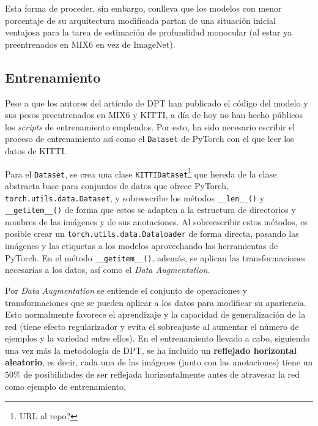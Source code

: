 Esta forma de proceder, sin embargo, conlleva que los modelos con menor porcentaje de su arquitectura modificada partan de una situación inicial ventajosa para la tarea de estimación de profundidad monocular (al estar ya preentrenados en MIX6 en vez de ImageNet).

\subsection{Entrenamiento}
Pese a que los autores del artículo de DPT \cite{visiontransformersDPT} han publicado el código del modelo y sus pesos preentrenados en MIX6 y KITTI, a día de hoy no han hecho públicos los \textit{scripts} de entrenamiento empleados. Por esto, ha sido necesario escribir el proceso de entrenamiento así como el \texttt{Dataset} de PyTorch con el que leer los datos de KITTI.

Para el \texttt{Dataset}, se crea una clase \texttt{KITTIDataset}\footnote{URL al repo?} que hereda de la clase abstracta base para conjuntos de datos que ofrece PyTorch, \texttt{torch.utils.data.Dataset}, y sobreescribe los métodos \texttt{\_\_len\_\_()} y \texttt{\_\_getitem\_\_()} de forma que estos se adapten a la estructura de directorios y nombres de las imágenes y de sus anotaciones. Al sobreescribir estos métodos, es posible crear un \texttt{torch.utils.data.Dataloader} de forma directa, pasando las imágenes y las etiquetas a los modelos aprovechando las herramientas de PyTorch. En el método \texttt{\_\_getitem\_\_()}, además, se aplican las transformaciones necesarias a los datos, así como el \textit{Data Augmentation}.

Por \textit{Data Augmentation} se entiende el conjunto de operaciones y transformaciones que se pueden aplicar a los datos para modificar su apariencia. Esto normalmente favorece el aprendizaje y la capacidad de generalización de la red (tiene efecto regularizador y evita el sobreajuste al aumentar el número de ejemplos y la variedad entre ellos). En el entrenamiento llevado a cabo, siguiendo una vez más la metodología de DPT, se ha incluido un \textbf{reflejado horizontal aleatorio}, es decir, cada una de las imágenes (junto con las anotaciones) tiene un $50\%$ de posibilidades de ser reflejada horizontalmente antes de atravesar la red como ejemplo de entrenamiento.

